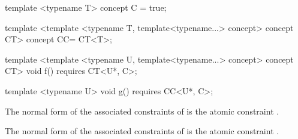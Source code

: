 \documentclass{wg21}
\begin{document}
\begin{addedblock}
\begin{example}
\begin{codeblock}
template <typename T>
concept C = true;

template <template <typename T, template<typename...> concept> concept CT>
concept CC= CT<T>;

template <template <typename U, template<typename...> concept> concept CT>
void f() requires CT<U*, C>;

template <typename U>
void g() requires CC<U*, C>;
\end{codeblock}

The normal form of the associated constraints of  is the
atomic constraint .

The normal form of the associated constraints of  is the
atomic constraint .

\end{example}
\end{addedblock}
%
\end{document}
